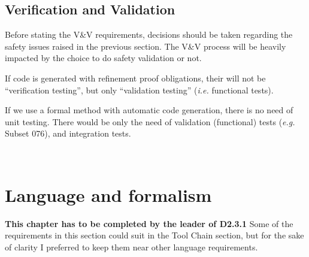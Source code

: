 \documentclass{template/openetcs_article}
\begin{document}

\tbc


\subsection{Verification and Validation}



\begin{issue}Before stating the V\&V requirements, decisions should be taken regarding 
the safety issues raised in the previous section. The V\&V process will be heavily impacted
by the choice to do safety validation or not. 

If code is generated with refinement proof obligations, 
their will not be “verification testing”, but only “validation testing” 
(\emph{i.e.} functional tests).

If we use a formal method with automatic code generation, there is no need of unit testing. 
There would be only the need of validation (functional) tests (\emph{e.g.} Subset 076), and 
integration tests.

\\

\end{issue}

\tbc

\section{Language and formalism}
\textbf{This chapter has to be completed by the leader of D2.3.1}
Some of the requirements in this section could suit in the Tool Chain section, but for the sake 
of clarity I preferred to keep them near other language requirements.
\end{document}
